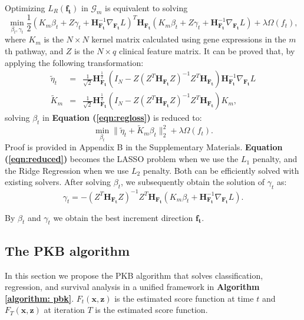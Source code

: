 \documentclass[a4paper,12pt]{article}
\newcommand{\bd}[1]{\mathbf{#1}}
\newcommand{\grad}[2]{\nabla_{\bd{#2}} #1}
\newcommand{\hess}[1]{\bd{H}_{\bd{#1}}}
\begin{document}
Optimizing $L_R(\bd{f_t})$ in $\mathcal{G}_m$ is equivalent to solving
\begin{equation}
\label{eqn:regloss}
\min_{\beta_t, \gamma_t} \frac{1}{2} (K_m \beta_t + Z \gamma_t + \hess{F_t}^{-1} \grad{L}{F_t})^T \hess{F_t} (K_m \beta_t + Z \gamma_t + \hess{F_t}^{-1} \grad{L}{F_t}) + \lambda \Omega({f_t}),
\end{equation}
where $K_m$ is the $N \times N$ kernel matrix calculated using gene expressions in the $m$th pathway, and $Z$ is the $N \times q$ clinical feature matrix. It can be proved that, by applying the following transformation:
\begin{eqnarray*}
	\tilde{\eta}_t &=& \frac{1}{\sqrt{2}}\hess{F_t}^{\frac{1}{2}}(I_N - Z(Z^T \hess{F_t} Z)^{-1}Z^T \hess{F_t})\hess{F_t}^{-1}\grad{L}{F_t}\\
	\tilde{K}_m &=& \frac{1}{\sqrt{2}}\hess{F_t}^{\frac{1}{2}}(I_N - Z(Z^T\hess{F_t}Z)^{-1}Z^T\hess{F_t})K_m,
\end{eqnarray*}
solving $\beta_t$ in \textbf{Equation (\ref{eqn:regloss})} is reduced to:
\begin{equation}
\label{eqn:reduced}
\min_{\beta_t} \|\tilde{\eta}_t + \tilde{K}_m \beta_t \|_2^2 + \lambda \Omega({f_t}).
\end{equation}
Proof is provided in Appendix B in the Supplementary Materials. \textbf{Equation (\ref{eqn:reduced})} becomes the LASSO problem when we use the $L_1$ penalty, and the Ridge Regression when we use $L_2$ penalty. Both can be efficiently solved with existing solvers. After solving $\beta_t$, we subsequently obtain the solution of $\gamma_t$ as:
$$\gamma_t = -(Z^T\hess{F_t}Z)^{-1}Z^T\hess{F_t}(K_m\beta_t + \hess{F_t}^{-1}\grad{L}{F_t}).$$

By $\beta_t$ and $\gamma_t$ we obtain the best increment direction $\bd{f_t}$.

\subsection{The PKB algorithm}
In this section we propose the PKB algorithm that solves classification, regression, and survival analysis in a unified framework in \textbf{Algorithm \ref{algorithm: pbk}}. $F_t(\bd{x}, \bd{z})$ is the estimated score function at time $t$ and $F_T(\bd{x}, \bd{z})$ at iteration $T$ is the estimated score function.
\end{document}
